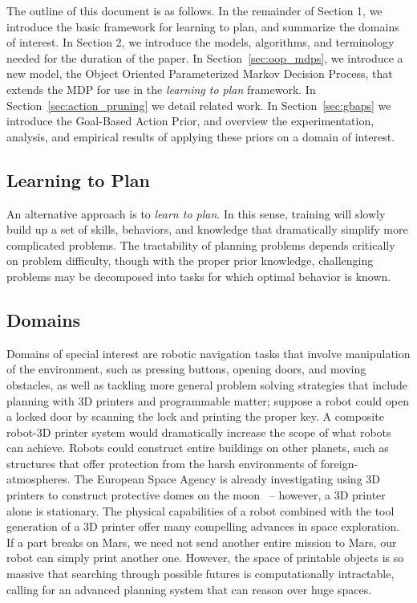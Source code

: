 \documentclass[11pt]{article}
\begin{document}
The outline of this document is as follows. In the remainder of Section 1, we introduce the basic framework for learning to plan, and summarize the domains of interest. In Section 2, we introduce the models, algorithms, and terminology needed for the duration of the paper. In Section~\ref{sec:oop_mdps}, we introduce a new model, the Object Oriented Parameterized Markov Decision Process, that extends the MDP for use in the {\it learning to plan} framework. In Section~\ref{sec:action_pruning} we detail related work. In Section~\ref{sec:gbaps} we introduce the Goal-Based Action Prior, and overview the experimentation, analysis, and empirical results of applying these priors on a domain of interest.

\subsection{Learning to Plan}
An alternative approach is to {\it learn to plan}. In this sense, training  will slowly build up a set of skills, behaviors, and knowledge that dramatically simplify more complicated problems.
The tractability of planning problems depends critically on problem difficulty, though with the proper prior knowledge, challenging problems may be decomposed into tasks for which optimal behavior is known.



\subsection{Domains}
Domains of special interest are robotic navigation tasks that involve manipulation of the environment, such as pressing buttons, opening doors, and moving obstacles, as well as tackling more general problem solving strategies that include planning with 3D printers and programmable matter; suppose a robot could open a locked door by scanning the lock and printing the proper key. A composite robot-3D printer system would dramatically increase the scope of what robots can achieve. Robots could construct entire buildings on other planets, such as structures that offer protection from the harsh environments of foreign-atmospheres. The European Space Agency is already investigating using 3D printers to construct protective domes on the moon~\cite{ceccanti20103D,Cesaretti2014430} -- however, a 3D printer alone is stationary. The physical capabilities of a robot combined with the tool generation of a 3D printer offer many compelling advances in space exploration. If a part breaks on Mars, we need not send another entire mission to Mars, our robot can simply print another one. However, the space of printable objects is so massive that searching through possible futures is computationally intractable, calling for an advanced planning system that can reason over huge spaces.
\end{document}
